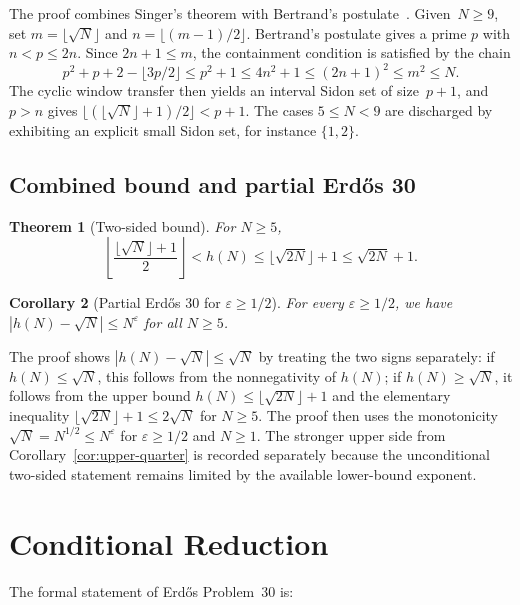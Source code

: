 \documentclass[11pt,a4paper]{article}
\newtheorem{theorem}{Theorem}[section]
\newtheorem{corollary}[theorem]{Corollary}
\begin{document}
The proof combines Singer's theorem with Bertrand's
postulate~\cite{Bertrand1845}.  Given~$N \ge 9$, set
$m=\lfloor\sqrt N\rfloor$ and $n=\lfloor(m-1)/2\rfloor$.  Bertrand's
postulate gives a prime \(p\) with \(n<p\le2n\).  Since \(2n+1\le m\), the
containment condition is satisfied by the chain
\[
  p^2+p+2-\lfloor 3p/2\rfloor
  \le p^2+1 \le 4n^2+1 \le (2n+1)^2 \le m^2 \le N .
\]
The cyclic window transfer then yields an interval Sidon set of size~$p+1$,
and \(p>n\) gives
\(\lfloor(\lfloor\sqrt N\rfloor+1)/2\rfloor < p+1\).  The cases
$5 \le N < 9$ are discharged by exhibiting an explicit small Sidon set, for
instance $\{1,2\}$.

\subsection{Combined bound and partial Erd\H{o}s 30}

\begin{theorem}[Two-sided bound]
\label{thm:two-sided}
For $N \ge 5$,
\[
  \left\lfloor\frac{\lfloor\sqrt{N}\rfloor+1}{2}\right\rfloor
  < h(N) \le \lfloor\sqrt{2N}\rfloor+1 \le \sqrt{2N}+1 .
\]
\end{theorem}

\begin{corollary}[Partial Erd\H{o}s 30 for $\varepsilon \ge 1/2$]
\label{cor:partial}
For every $\varepsilon \ge 1/2$, we have
$|h(N) - \sqrt{N}| \le N^\varepsilon$ for all $N \ge 5$.
\end{corollary}

The proof shows $|h(N) - \sqrt{N}| \le \sqrt{N}$ by treating the two signs
separately: if \(h(N)\le\sqrt N\), this follows from the nonnegativity of
\(h(N)\); if \(h(N)\ge\sqrt N\), it follows from the upper bound
\(h(N)\le\lfloor\sqrt{2N}\rfloor+1\) and the elementary inequality
\(\lfloor\sqrt{2N}\rfloor+1\le2\sqrt N\) for \(N\ge5\).  The proof then uses
the monotonicity $\sqrt{N} = N^{1/2} \le N^\varepsilon$ for
$\varepsilon \ge 1/2$ and $N \ge 1$.
The stronger upper side from Corollary~\ref{cor:upper-quarter} is recorded
separately because the unconditional two-sided statement remains limited by
the available lower-bound exponent.

\section{Conditional Reduction}
\label{sec:conditional}

The formal statement of Erd\H{o}s Problem~30 is:
\end{document}
